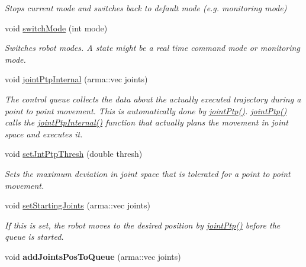 \begin{DoxyCompactItemize}
\begin{DoxyCompactList}\small\item\em Stops current mode and switches back to default mode (e.\-g. monitoring mode) \end{DoxyCompactList}\item 
void \hyperlink{classkukadu_1_1PlottingControlQueue_ace69c9adaff27b5d98a42e70f7bc64ff}{switch\-Mode} (int mode)
\begin{DoxyCompactList}\small\item\em Switches robot modes. A state might be a real time command mode or monitoring mode. \end{DoxyCompactList}\item 
\hypertarget{classkukadu_1_1PlottingControlQueue_aa7ce40e835eeccff82acafea0f069c83}{void \hyperlink{classkukadu_1_1PlottingControlQueue_aa7ce40e835eeccff82acafea0f069c83}{joint\-Ptp\-Internal} (arma\-::vec joints)}\label{classkukadu_1_1PlottingControlQueue_aa7ce40e835eeccff82acafea0f069c83}

\begin{DoxyCompactList}\small\item\em The control queue collects the data about the actually executed trajectory during a point to point movement. This is automatically done by \hyperlink{classkukadu_1_1ControlQueue_ad11059100321b24a1af8ef7de8314353}{joint\-Ptp()}. \hyperlink{classkukadu_1_1ControlQueue_ad11059100321b24a1af8ef7de8314353}{joint\-Ptp()} calls the \hyperlink{classkukadu_1_1PlottingControlQueue_aa7ce40e835eeccff82acafea0f069c83}{joint\-Ptp\-Internal()} function that actually plans the movement in joint space and executes it. \end{DoxyCompactList}\item 
void \hyperlink{classkukadu_1_1PlottingControlQueue_a32b42bcaf1a674c41449ddec692a2dfa}{set\-Jnt\-Ptp\-Thresh} (double thresh)
\begin{DoxyCompactList}\small\item\em Sets the maximum deviation in joint space that is tolerated for a point to point movement. \end{DoxyCompactList}\item 
void \hyperlink{classkukadu_1_1PlottingControlQueue_a16154678068808ba8989012f044f4a5e}{set\-Starting\-Joints} (arma\-::vec joints)
\begin{DoxyCompactList}\small\item\em If this is set, the robot moves to the desired position by \hyperlink{classkukadu_1_1ControlQueue_ad11059100321b24a1af8ef7de8314353}{joint\-Ptp()} before the queue is started. \end{DoxyCompactList}\item 
\hypertarget{classkukadu_1_1PlottingControlQueue_a047711793bacebf460a84015c7e7f589}{void {\bfseries add\-Joints\-Pos\-To\-Queue} (arma\-::vec joints)}\label{classkukadu_1_1PlottingControlQueue_a047711793bacebf460a84015c7e7f589}


\end{DoxyCompactItemize}
